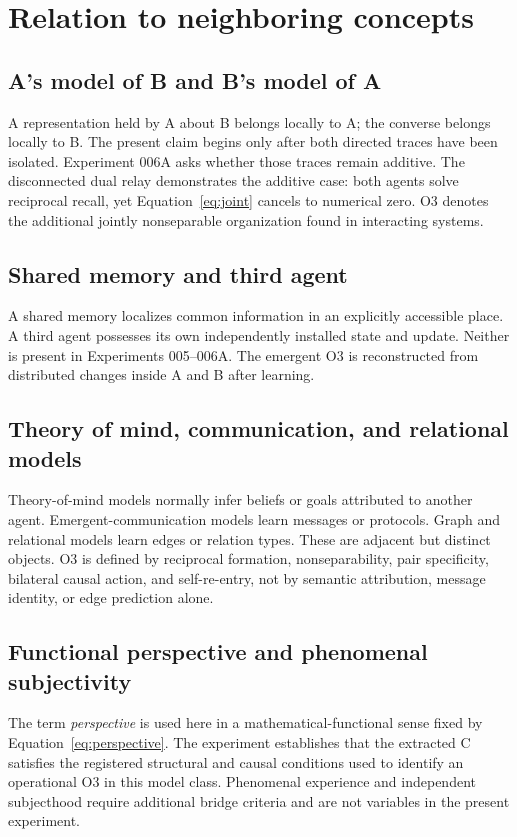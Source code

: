 \documentclass[11pt,a4paper]{article}
\begin{document}
\section{Relation to neighboring concepts}

\subsection{A's model of B and B's model of A}

A representation held by A about B belongs locally to A; the converse belongs locally to B. The present claim begins only after both directed traces have been isolated. Experiment 006A asks whether those traces remain additive. The disconnected dual relay demonstrates the additive case: both agents solve reciprocal recall, yet Equation~\eqref{eq:joint} cancels to numerical zero. O3 denotes the additional jointly nonseparable organization found in interacting systems.

\subsection{Shared memory and third agent}

A shared memory localizes common information in an explicitly accessible place. A third agent possesses its own independently installed state and update. Neither is present in Experiments 005--006A. The emergent O3 is reconstructed from distributed changes inside A and B after learning.

\subsection{Theory of mind, communication, and relational models}

Theory-of-mind models normally infer beliefs or goals attributed to another agent. Emergent-communication models learn messages or protocols. Graph and relational models learn edges or relation types. These are adjacent but distinct objects. O3 is defined by reciprocal formation, nonseparability, pair specificity, bilateral causal action, and self-re-entry, not by semantic attribution, message identity, or edge prediction alone.

\subsection{Functional perspective and phenomenal subjectivity}

The term \emph{perspective} is used here in a mathematical-functional sense fixed by Equation~\eqref{eq:perspective}. The experiment establishes that the extracted C satisfies the registered structural and causal conditions used to identify an operational O3 in this model class. Phenomenal experience and independent subjecthood require additional bridge criteria and are not variables in the present experiment.
\end{document}
